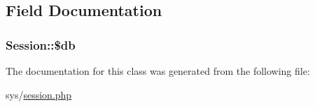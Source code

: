 \subsection{Field Documentation}
\hypertarget{classSession_a6a94f28f5a5b3f188984821c8bebf9bf}{}
\subsubsection[{\$db}]{\setlength{\rightskip}{0pt plus 5cm}Session\+::\$db\hspace{0.3cm}{\ttfamily [protected]}}\label{classSession_a6a94f28f5a5b3f188984821c8bebf9bf}


The documentation for this class was generated from the following file\+:\begin{DoxyCompactItemize}
\item 
sys/\hyperlink{session_8php}{session.\+php}\end{DoxyCompactItemize}
